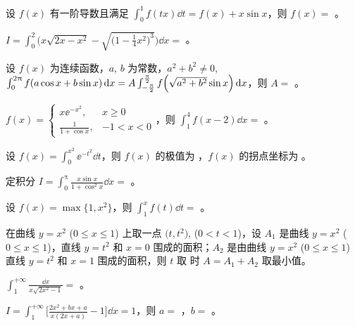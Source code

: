 \begin{ti}
	设 $f(x)$ 有一阶导数且满足 $\int_0^1 f(tx) \dd{t} = f(x) + x \sin x$，则 $f(x) = $ \hua。
\end{ti}

\begin{ti}
	$I = \int_0^2 \Biggl( x \sqrt{2x - x^2} - \sqrt{ \biggl( 1 - \frac{1}{4}x^2 \biggr)^3 } \Biggr) \dd{x} = $ \hua。
\end{ti}

\begin{ti}
	设 $f(x)$ 为连续函数，$a$, $b$ 为常数，$a^2 + b^2 \ne 0$, $\int_0^{2\uppi} f(a \cos x + b \sin x) \dd{x} = A \int_{-\frac{\uppi}{2}}^{\frac{\uppi}{2}} f \Bigl( \sqrt{a^2+b^2} \* \sin x \Bigr) \dd{x}$，则 $A = $ \hua。 
\end{ti}

\begin{ti}
	$f(x) = \begin{cases}
		x \ee^{-x^2}, & x \geq 0 \\
		\frac{1}{1 + \cos x}, & -1 < x < 0
	\end{cases}$，则 $\int_1^4 f(x-2) \dd{x} = $ \hua。
\end{ti}

\begin{ti}
	设 $f(x) = \int_0^{x^2} \ee^{-t^2} \dd{t}$，则 $f(x)$ 的极值为 \hua，$f(x)$ 的拐点坐标为 \hua。
\end{ti}

\begin{ti}
	定积分 $I = \int_0^\uppi \frac{x \sin x}{1 + \cos^2 x} \dd{x} = $ \hua。
\end{ti}

\begin{ti}
	设 $f(x) = \max \bigl\{ 1,x^2 \bigr\}$，则 $\int_1^x f(t) \dd{t} = $ \hua。
\end{ti}

\begin{ti}
	在曲线 $y = x^2$ ($0 \leq x \leq 1$) 上取一点 $\bigl( t,t^2 \bigr)$, ($0 < t < 1$)，设 $A_1$ 是曲线 $y = x^2$ ($0 \leq x \leq 1$)，直线 $y = t^2$ 和 $x = 0$ 围成的面积；$A_2$ 是由曲线 $y = x^2$ ($0 \leq x \leq 1$) 直线 $y = t^2$ 和 $x = 1$ 围成的面积，则 $t$ 取 \hua{} 时 $A = A_1 + A_2$ 取最小值。
\end{ti}

\begin{ti}
	$\int_1^{+\infty} \frac{\dd{x}}{x \sqrt{2x^2 - 1}} = $ \hua。
\end{ti}

\begin{ti}
	$I = \int_1^{+\infty} \biggl[ \frac{2x^2 + bx + a}{x(2x + a)} - 1 \biggr] \dd{x} = 1$，则 $a = $ \hua，$b = $ \hua。
\end{ti}

